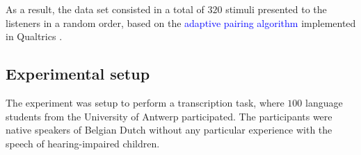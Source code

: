As a result, the data set consisted in a total of $320$ stimuli presented to the listeners in a random order, based on the \textcolor{blue}{adaptive pairing algorithm} \citep{Pollitt_2012b} implemented in Qualtrics \cite{Qualtrics_2005}.
%
\begin{comment}
under the Design of Experiments (DoE) literature, we would say we have $32$ experimental units with $10$ replicate runs each, making a total of $320$ experimental runs. As it is defined in \citet{Lawson_2015}, an experimental unit is the item under study upon which something is changed, while a replicate run is the experiment conducted with the same factor settings, but using different experimental units. 
\end{comment}
%
\begin{comment}
evidence suggest that the number of comparisons and pairing algorithm impacts the reliability, validity and efficiency of the procedure \citep{Bramley_2015, Bramley_et_al_2018, Lesterhuis_2018, Verhavert_et_al_2019}. However, this is not investigated in the current research.
\end{comment}
%
\begin{comment}
Similar designs were used by \citet{Boonen_et_al_2020} and \citet{Faes_et_al_2021}. However, in the former case the number of samples were low, while in the latter, the design was unbalanced and not conducive to appropriate inferences from the pairwise comparisons.
\end{comment}
%
\begin{comment}
	\textbf{for the experimenter:} Based on \citet{Faes_et_al_2021} we depict the procedure for the experimenter:
	\begin{enumerate}
		\item 1. matching procedure 
		\item selection of suitable stimuli
		\item determine the number of stimuli per judge 
	\end{enumerate}	
\end{comment}
%
%
\subsection{Experimental setup}
%
The experiment was setup to perform a transcription task, where $100$ language students from the University of Antwerp participated. The participants were native speakers of Belgian Dutch without any particular experience with the speech of hearing-impaired children.

